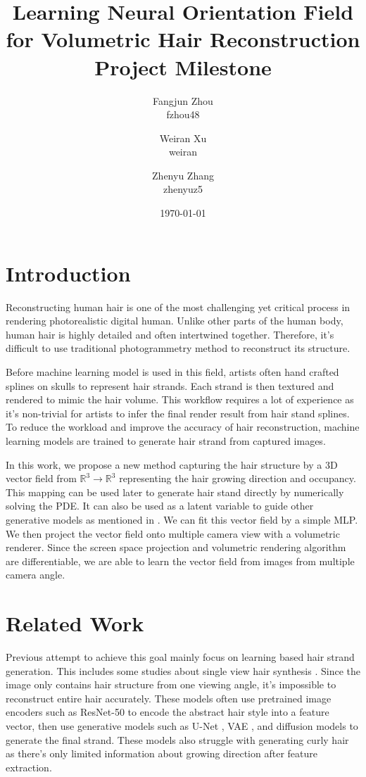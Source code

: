 \documentclass[12pt]{article}
\title{
  Learning Neural Orientation Field for Volumetric Hair Reconstruction \\
  {
    \small
    Project Milestone
  }
}
\author{
  Fangjun Zhou \\ fzhou48
  \and Weiran Xu \\ weiran
  \and Zhenyu Zhang \\ zhenyuz5
}
\date{\today}
\begin{document}
  \maketitle

  \section{Introduction}

  Reconstructing human hair is one of the most challenging yet critical process in rendering photorealistic digital human. Unlike other parts of the human body, human hair is highly detailed and often intertwined together. Therefore, it's difficult to use traditional photogrammetry method to reconstruct its structure.

  Before machine learning model is used in this field, artists often hand crafted splines on skulls to represent hair strands. Each strand is then textured and rendered to mimic the hair volume. This workflow requires a lot of experience as it's non-trivial for artists to infer the final render result from hair stand splines. To reduce the workload and improve the accuracy of hair reconstruction, machine learning models are trained to generate hair strand from captured images.

    In this work, we propose a new method capturing the hair structure by a 3D vector field from $\mathbb{R}^{3} \rightarrow \mathbb{R}^{3}$ representing the hair growing direction and occupancy. This mapping can be used later to generate hair stand directly by numerically solving the PDE. It can also be used as a latent variable to guide other generative models as mentioned in \cite{metzer_latent-nerf_2022}. We can fit this vector field by a simple MLP. We then project the vector field onto multiple camera view with a volumetric renderer. Since the screen space projection and volumetric rendering algorithm are differentiable, we are able to learn the vector field from images from multiple camera angle.

  \section{Related Work}

  Previous attempt to achieve this goal mainly focus on learning based hair strand generation. This includes some studies about single view hair synthesis \cite{saito_3d_2018, zheng_hairstep_2023, wu_neuralhdhair_2022, ma_single-view_nodate}. Since the image only contains hair structure from one viewing angle, it's impossible to reconstruct entire hair accurately. These models often use pretrained image encoders such as ResNet-50 \cite{saito_3d_2018} to encode the abstract hair style into a feature vector, then use generative models such as U-Net \cite{zheng_hairstep_2023}, VAE \cite{saito_3d_2018}, and diffusion models \cite{sklyarova_neural_2023} to generate the final strand. These models also struggle with generating curly hair as there's only limited information about growing direction after feature extraction.
\end{document}
